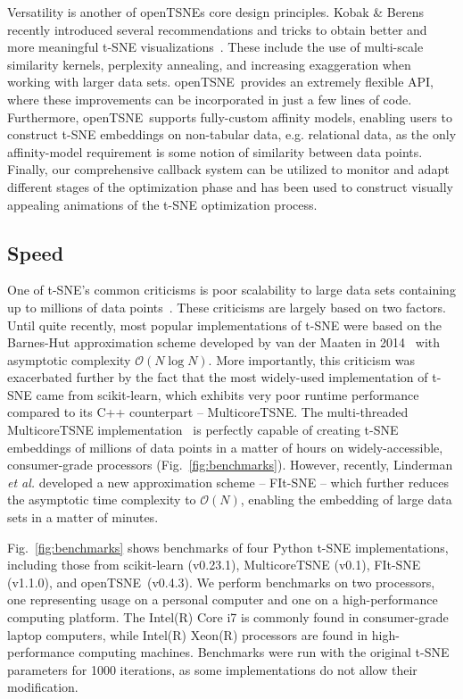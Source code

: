 \documentclass[twocolumn]{bmcart}
\newcommand{\opentsne}{\textsf{openTSNE}}
\begin{document}
Versatility is another of  \opentsne s core design principles. Kobak \& Berens
recently introduced several recommendations and tricks to obtain better and
more meaningful t-SNE visualizations~\cite{kobak2019art}. These include the use
of multi-scale similarity kernels, perplexity annealing, and increasing
exaggeration when working with larger data sets. \opentsne\ provides an
extremely flexible API, where these improvements can be incorporated in just a
few lines of code. Furthermore, \opentsne\ supports fully-custom affinity models,
enabling users to construct t-SNE embeddings on
non-tabular data, e.g. relational data, as the only affinity-model requirement
is some notion of similarity between data points. Finally, our comprehensive
callback system can be utilized to monitor and adapt different stages of the
optimization phase and has been used to construct visually appealing animations
of the t-SNE optimization process.

\subsection*{Speed}

One of t-SNE's common criticisms is poor scalability to large data sets
containing up to millions of data points~\cite{becht2019dimensionality}. These
criticisms are largely based on two factors. Until quite recently, most popular
implementations of t-SNE were based on the Barnes-Hut approximation scheme
developed by van der Maaten in 2014~\cite{van2014accelerating} with asymptotic
complexity $\mathcal{O}(N \log N)$. More importantly, this criticism was
exacerbated further by the fact that the most widely-used implementation of
t-SNE came from \textsf{scikit-learn}, which exhibits very poor runtime
performance compared to its C++ counterpart -- \textsf{MulticoreTSNE}. The
multi-threaded \textsf{MulticoreTSNE} implementation~\cite{Ulyanov2016} is
perfectly capable of creating t-SNE embeddings of millions of data points in a
matter of hours on widely-accessible, consumer-grade processors
(Fig.~\ref{fig:benchmarks}). However, recently, Linderman \textit{et al.}
developed a new approximation scheme -- FIt-SNE -- which further reduces the
asymptotic time complexity to $\mathcal{O}(N)$, enabling the embedding of large
data sets in a matter of minutes.

Fig.~\ref{fig:benchmarks} shows benchmarks of four Python t-SNE implementations,
including those from \textsf{scikit-learn} (v0.23.1), \textsf{MulticoreTSNE}
(v0.1), \textsf{FIt-SNE} (v1.1.0), and \opentsne\ (v0.4.3). We perform
benchmarks on two processors, one representing usage on a personal computer and
one on a high-performance computing platform. The Intel(R) Core i7 is commonly
found in consumer-grade laptop computers, while Intel(R) Xeon(R) processors are
found in high-performance computing machines. Benchmarks were run with the
original t-SNE parameters for 1000 iterations, as some implementations do not
allow their modification.
\end{document}

